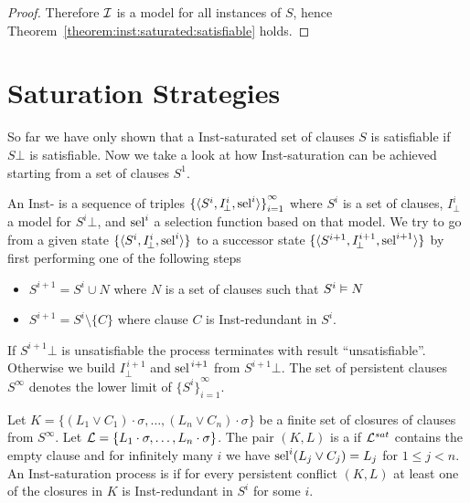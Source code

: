 \begin{proof}
        Therefore \( \mathcal{I} \) is a model for all instances of \( S \),
        hence
        Theorem~\vref{theorem:inst:saturated:satisfiable} holds.
   \end{proof}


   \section{Saturation Strategies}\label{sec:saturation:strategies}

   So far we have only shown that a Inst-saturated set of clauses
   \( S \) is satisfiable if \( S\bot \) is satisfiable.
   Now we take a look at how Inst-saturation can be achieved
   starting from a set of clauses \( S^1 \).

   \begin{definition}
    An Inst- is a sequence of triples
    \(
        {\{
            \langle
            S^i, I^{i}_{\!\bot}, \operatorname{sel}^i
            \rangle
            \}}_{i=1}^\infty
    \)
    where \( S^i \) is a set of clauses,
    \( I^{i}_{\!\bot} \) a model for \( S^i\bot \),
    and \( \operatorname{sel}^i \) a selection function based on that model.
%
    We try to go from a given state
    \( {\{ \langle S^i, I^{i}_{\!\bot}, \operatorname{sel}^i \rangle \}} \)
    to a successor state
    \( {\{ \langle S^{i+1}, I^{i+1}_{\!\bot}, \operatorname{sel}^{i+1} \rangle \}} \)
    by first performing one of the following steps
    \begin{itemize}
        \item
        \( S^{i+1} = S^i \cup N \)
        where \( N \) is a set of clauses such that
        \( S^i \vDash N \)
        \item
        \( S^{i+1} = S^i \setminus \{ C \} \)
        where clause \( C \) is Inst-redundant in \( S^{i} \).
    \end{itemize}
\noindent If \( S^{i+1}\! \bot \) is unsatisfiable
the process terminates with result “unsatisfiable”.
Otherwise we build \( I^{\,i+1}_{\!\bot} \) and \( \operatorname{sel}^{\,i+1} \)
from \( S^{i+1}\!\bot \).
%
The set of persistent clauses \( S^\infty \) denotes the lower limit of \( {\{ S^i \}}_{i=1}^\infty \).
\end{definition}

\begin{definition}
    Let
    \( K = \{ (L_1\lor C_1)\cdot\sigma, \ldots, (L_n\lor C_n)\cdot\sigma \} \)
    be a finite set of closures
    of clauses from \( S^\infty \).
    Let \( \mathcal{L} = \{ L_1\cdot\sigma, \ldots, L_n\cdot\sigma \} \).
    The pair \( (K,L) \) is a  if
    \( \mathcal{L}^{sat} \) contains the empty clause
    and for infinitely many \( i \)
    we have \( \operatorname{sel}^i(L_j\lor C_j) = L_j \)
    for \( 1\leq j < n \).
    An Inst-saturation process is 
    if for every persistent conflict
    \( (K,L) \)
    at least one of the closures in \( K \)
    is Inst-redundant in \( S^i \) for some \( i \).
    \end{definition}

